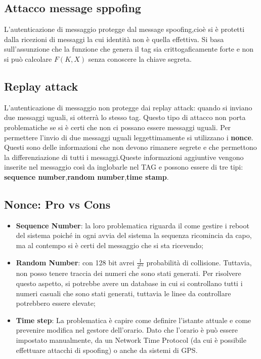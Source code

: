 \documentclass{article}
\theoremstyle{remark}
\begin{document}
\subsection{Attacco message sppofing}
L'autenticazione di messaggio protegge dal message spoofing,cioè si è protetti dalla ricezioni di messaggi la cui identità non è quella effettiva. Si basa sull'assunzione che la funzione che genera il tag sia crittogaficamente forte e non si può calcolare $F(K,X)$ senza conoscere la chiave segreta.
\subsection{Replay attack}
L'autenticazione di messaggio non protegge dai replay attack: quando si inviano due messaggi uguali, si otterrà lo stesso tag. Questo tipo di attacco non porta problematiche se si è certi che non ci possano essere messaggi uguali.
Per permettere l'invio di due messaggi uguali leggettimamente si utilizzano i \textbf{nonce}. Questi sono delle informazioni che non devono rimanere segrete e che permettono la differenziazione di tutti i messaggi.\newline Queste informazioni aggiuntive vengono inserite nel messaggio così da inglobarle nel TAG e possono essere di tre tipi: \textbf{sequence number},\textbf{random number},\textbf{time stamp}.
\subsection{Nonce: Pro vs Cons}
\begin{itemize}
	\item \textbf{Sequence Number}: la loro problematica riguarda il come gestire i reboot del sistema poiché in ogni avvia del sistema la sequenza ricomincia da capo, ma al contempo si è certi del messaggio che si sta ricevendo;
	\item \textbf{Random Number}: con 128 bit avrei $\frac{1}{2^{64}}$ probabilità di collisione. Tuttavia, non posso tenere traccia dei numeri che sono stati generati. Per risolvere questo aspetto, si potrebbe avere un database in cui si controllano tutti i numeri casuali che sono stati generati, tuttavia le linee da controllare potrebbero essere elevate;
	\item \textbf{Time step}: La problematica è capire come definire l'istante attuale e come prevenire modifica nel gestore dell'orario. Dato che l'orario è può essere impostato manualmente, da un Network Time Protocol (da cui è possibile effettuare attacchi di spoofing) o anche da sistemi di GPS.
\end{itemize}
\end{document}
